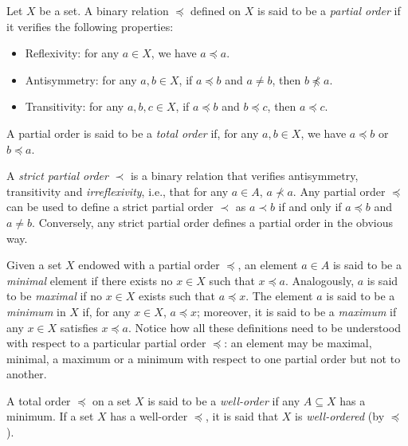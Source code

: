 \begin{definition}
Let $X$ be a set. A binary relation $\preceq$ defined on $X$ is said to be a \emph{partial order} if it verifies the following properties:
\begin{itemize}
\item Reflexivity: for any $a\in X$, we have $a\preceq a$.
\item Antisymmetry: for any $a,b\in X$, if $a\preceq b$ and $a\neq b$, then $b\not\preceq a$.
\item Transitivity: for any $a,b,c\in X$, if $a\preceq b$ and $b\preceq c$, then $a\preceq c$.
\end{itemize}
A partial order is said to be a \emph{total order} if, for any $a,b\in X$, we have $a\preceq b$ or $b\preceq a$.

A \emph{strict partial order} $\prec$ is a binary relation that verifies antisymmetry, transitivity and \emph{irreflexivity}, i.e., that for any $a\in A$, $a\not\prec a$. 
Any partial order $\preceq$ can be used to define a strict partial order $\prec$ as $a \prec b$ if and only if $a\preceq b$ and $a\neq b$.
Conversely, any strict partial order defines a partial order in the obvious way.

Given a set $X$ endowed with a partial order $\preceq$, an element $a\in A$ is said to be a \emph{minimal} element if there exists no $x\in X$ such that $x\preceq a$.
Analogously, $a$ is said to be \emph{maximal} if no $x\in X$ exists such that $a\preceq x$.
The element $a$ is said to be a \emph{minimum} in $X$ if, for any $x\in X$, $a\preceq x$; moreover, it is said to be a \emph{maximum} if any $x\in X$ satisfies $x\preceq a$.
Notice how all these definitions need to be understood with respect to a particular partial order $\preceq$: an element may be maximal, minimal, a maximum or a minimum with respect to one partial order but not to another.

A total order $\preceq$ on a set $X$ is said to be a \emph{well-order} if any $A\subseteq X$ has a minimum. If a set $X$ has a well-order $\preceq$, it is said that $X$ is \emph{well-ordered} (by $\preceq$).
\label{<+label+>}
\end{definition}


